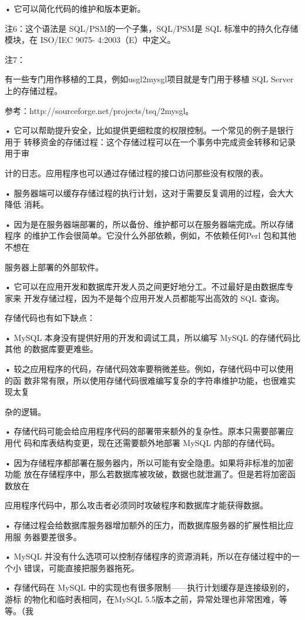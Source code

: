 • 它可以简化代码的维护和版本更新。

注6：这个语法是 SQL/PSM的一个子集，SQL/PSM是 SQL 标准中的持久化存储模块，在 ISO/IEC 9075-
4:2003（E）中定义。

注7：

有一些专门用作移植的工具，例如usgl2mysgl项目就是专门用于移植 SQL Server 上的存储过程。

参考：http://sourceforge.net/projects/tsq/2mysgl。

• 它可以帮助提升安全，比如提供更细粒度的权限控制。一个常见的例子是银行用于
转移资金的存储过程：这个存储过程可以在一个事务中完成资金转移和记录用于审

计的日志。应用程序也可以通过存储过程的接口访问那些没有权限的表。

• 服务器端可以缓存存储过程的执行计划，这对于需要反复调用的过程，会大大降低
消耗。

• 因为是在服务器端部署的，所以备份、维护都可以在服务器端完成。所以存储程序
的维护工作会很简单。它没什么外部依赖，例如，不依赖任何Perl 包和其他不想在

服务器上部署的外部软件。

• 它可以在应用开发和数据库开发人员之间更好地分工。不过最好是由数据库专家来
开发存储过程，因为不是每个应用开发人员都能写出高效的 SQL 查询。

存储代码也有如下缺点：

• MySQL 本身没有提供好用的开发和调试工具，所以编写 MySQL 的存储代码比其他
的数据库要更难些。

• 较之应用程序的代码，存储代码效率要稍微差些。例如，存储代码中可以使用的函
数非常有限，所以使用存储代码很难编写复杂的字符串维护功能，也很难实现太复

杂的逻辑。

• 存储代码可能会给应用程序代码的部署带来额外的复杂性。原本只需要部署应用代
码和库表结构变更，现在还需要额外地部署 MySQL 内部的存储代码。

• 因为存储程序都部署在服务器内，所以可能有安全隐患。如果将非标准的加密功能
放在存储程序中，那么若数据库被攻破，数据也就泄漏了。但是若将加密函数放在

应用程序代码中，那么攻击者必须同时攻破程序和数据库才能获得数据。

• 存储过程会给数据库服务器增加额外的压力，而数据库服务器的扩展性相比应用服
务器要差很多。

• MySQL 并没有什么选项可以控制存储程序的资源消耗，所以在存储过程中的一个小
错误，可能直接把服务器拖死。

• 存储代码在 MySQL 中的实现也有很多限制——执行计划缓存是连接级别的，游标
的物化和临时表相同，在MySQL 5.5版本之前，异常处理也非常困难，等等。（我

